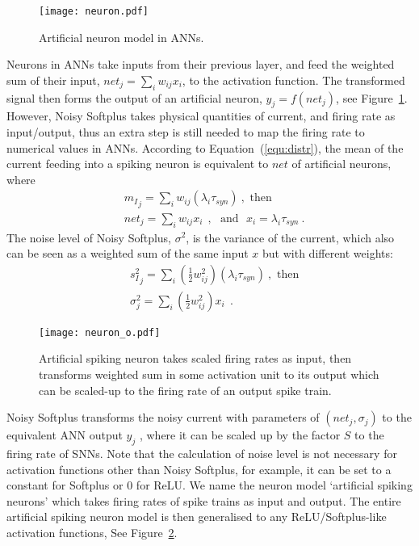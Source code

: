 \documentclass[runningheads,a4paper]{llncs}
\begin{document}
\begin{figure}[bt]
	\centering
	\texttt{[image: neuron.pdf]}
	\caption{Artificial neuron model in ANNs. }
	\label{Fig:neuron}
\end{figure}
Neurons in ANNs take inputs from their previous layer, and feed the weighted sum of their input, $net_j = \sum_i w_{ij}x_i$, to the activation function.
The transformed signal then forms the output of an artificial neuron, $y_j=f(net_j)$, see Figure~\ref{Fig:neuron}.	
However, Noisy Softplus takes physical quantities of current, and firing rate as input/output, thus an extra step is still needed to map the firing rate to numerical values in ANNs.
According to Equation~(\ref{equ:distr}), the mean of the current feeding into a spiking neuron is equivalent to $net$ of artificial neurons, where
\begin{equation}
\begin{aligned}
& {m_I}_j = \sum_i w_{ij}(\lambda_{i}\tau_{syn})~, \textrm{  then}\\
& net_j= \sum_i w_{ij} x_i~~, \textrm{~~and~~}
x_i = \lambda_{i}\tau_{syn}~.
\end{aligned}
\label{equ:mi_input}
\end{equation}
The noise level of Noisy Softplus, $\sigma^2$, is the variance of the current, which also can be seen as a weighted sum of the same input $x$ but with different weights:
\begin{equation}
\begin{aligned}
& {s_I^2}_j=\sum_i(\frac{1}{2} w_{ij}^2) (\lambda_{i}\tau_{syn})~, \textrm{  then}\\
& \sigma^2_j= \sum_i (\frac{1}{2} w_{ij}^2) x_i~~.
\end{aligned}
\label{equ:si_input}
\end{equation}

\begin{figure}[bt!]
	\centering
	\texttt{[image: neuron\_o.pdf]}
	\caption{Artificial spiking neuron takes scaled firing rates as input, then transforms weighted sum in some activation unit to its output which can be scaled-up to the firing rate of an output spike train.}
	\label{Fig:sneuron}
\end{figure}

Noisy Softplus transforms the noisy current with parameters of $(net_j, \sigma_j)$ to the equivalent ANN output $y_j$ , where it can be scaled up by the factor $S$ to the firing rate of SNNs.
Note that the calculation of noise level is not necessary for activation functions other than Noisy Softplus, for example, it can be set to a constant for Softplus or 0 for ReLU.
We name the neuron model `artificial spiking neurons' which takes firing rates of spike trains as input and output. 
The entire artificial spiking neuron model is then generalised to any ReLU/Softplus-like activation functions, See Figure~\ref{Fig:sneuron}.
\end{document}

